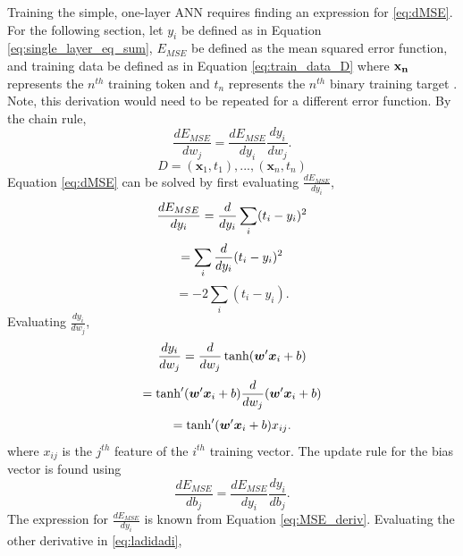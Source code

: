 Training the simple, one-layer ANN requires finding an expression for \ref{eq:dMSE}. For the following section, let $y_i$ be defined as in Equation \ref{eq:single_layer_eq_sum}, $E_{MSE}$ be defined as the mean squared error function, and training data be defined as in Equation \ref{eq:train_data_D} where $\bold{x_n}$ represents the $n^{th}$ training token and $t_n$ represents the $n^{th}$ binary training target \cite{Nielsen2015}. Note, this derivation would need to be repeated for a different error function. By the chain rule,
%
\begin{equation} \label{eq:dMSE}
\frac{dE_{MSE}}{dw_j} = \frac{dE_{MSE}}{dy_i} \frac{dy_i}{dw_j}.
\end{equation}
%
\begin{equation} \label{eq:train_data_D}
 D={(\boldsymbol{x}_1,t_1), ... ,(\boldsymbol{x}_n,t_n)}
\end{equation}
Equation \ref{eq:dMSE} can be solved by first evaluating $\frac{dE_{MSE}}{dy_i}$,
%
\begin{equation} \label{dE_{MSE}/dy_i}
\frac{dE_{MSE}}{dy_i}  = \frac{d}{dy_i} \sum_i(t_i - y_i)^2
\end{equation}
%
\begin{equation} \label{dE_{MSE}/dy_i}
 = \sum_i  \frac{d}{dy_i} (t_i - y_i)^2
\end{equation}
%
\begin{equation} \label{eq:MSE_deriv}
 =  -2 \sum_i  (t_i - y_i).
\end{equation}
%
Evaluating $\frac{dy_i}{dw_j}$,
%
\begin{equation} \label{dE_{MSE}/dy_i}
\frac{dy_i}{dw_j}  = \frac{d}{dw_j} \tanh( \boldsymbol{w}' \boldsymbol{x}_i + b) 
\end{equation}
%
\begin{equation} \label{dE_{MSE}/dy_i}
 = \tanh'( \boldsymbol{w}' \boldsymbol{x}_i + b) \frac{d}{dw_j}( \boldsymbol{w}' \boldsymbol{x}_i + b)
\end{equation}
%
\begin{equation} \label{dE_{MSE}/dy_i}
 = \tanh'( \boldsymbol{w}' \boldsymbol{x}_i + b)  x_{ij}.
\end{equation}
%
\noindent where $x_{ij}$ is the $j^{th}$ feature of the $i^{th}$ training vector.
%
The update rule for the bias vector is found using
%
\begin{equation} \label{eq:ladidadi}
\frac{dE_{MSE}}{db_j} = \frac{dE_{MSE}}{dy_i} \frac{dy_i}{db_j}.
\end{equation}
%
The expression for $\frac{dE_{MSE}}{dy_i}$ is known from Equation \ref{eq:MSE_deriv}. Evaluating the other derivative in \ref{eq:ladidadi},
